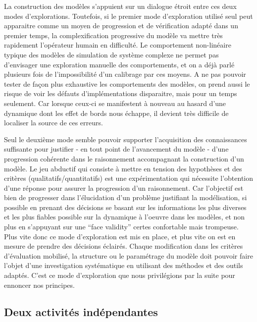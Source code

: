 La construction des modèles s'appuient sur un dialogue étroit entre ces deux modes d'explorations. Toutefois, si le premier mode d'exploration utilisé seul peut apparaitre comme un moyen de progression et de vérification adapté dans un premier temps, la complexification progressive du modèle va mettre très rapidement l'opérateur humain en difficulté. Le comportement non-linéaire typique des modèles de simulation de système complexe ne permet pas d'envisager une exploration manuelle des comportements, et on a déjà parlé plusieurs fois de l'impossibilité d'un calibrage par ces moyens. A ne pas pouvoir tester de façon plus exhaustive les comportements des modèles, on prend aussi le risque de voir les défauts d'implémentations disparaitre, mais pour un temps seulement. Car lorsque ceux-ci se manifestent à nouveau au hasard d'une dynamique dont les effet de bords nous échappe, il devient très difficile de localiser la source de ces erreurs. 

Seul le deuxième mode semble pouvoir supporter l'acquisition des connaissances suffisante pour justifier - en tout point de l'avancement du modèle - d'une progression cohérente dans le raisonnement accompagnant la construction d'un modèle. Le jeu abductif qui consiste à mettre en tension des hypothèses et des critères (qualitatifs/quantitatifs)  est une expérimentation qui nécessite l'obtention d'une réponse pour assurer la progression d'un raisonnement. Car l'objectif est bien de progresser dans l'élucidation d'un problème justifiant la modélisation, si possible en prenant des décisions se basant sur les informations les plus diverses et les plus fiables possible sur la dynamique à l'oeuvre dans les modèles, et non plus en s'appuyant sur une \foreignquote{english}{face validity} \autocite{Hermann1967} certes confortable mais trompeuse. Plus vite donc ce mode d'exploration est mis en place, et plus vite on est en mesure de prendre des décisions éclairés. Chaque modification dans les critères d'évaluation mobilisé, la structure ou le paramétrage du modèle doit pouvoir faire l'objet d'une investigation systématique en utilisant des méthodes et des outils adaptés. C'est ce mode d'exploration que nous privilégions par la suite pour ennoncer nos principes.

\subsection{Deux activités indépendantes}


